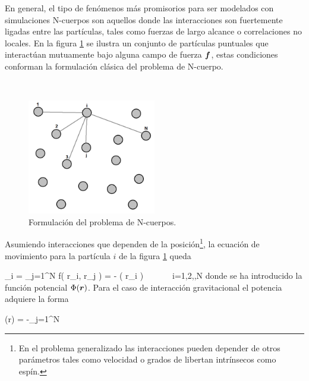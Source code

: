 En general, el tipo de fenómenos más promisorios para ser modelados con 
simulaciones N-cuerpos son aquellos donde las interacciones son 
fuertemente ligadas entre las partículas, tales como fuerzas de largo 
alcance o correlaciones no locales. En la figura \ref{fig:NbodyProblem}
se ilustra un conjunto de partículas puntuales que interactúan mutuamente 
bajo alguna campo de fuerza $\boldsymbol{ f }$, estas condiciones conforman la 
formulación clásica del problema de N-cuerpo.

\
\begin{figure}[htbp]
	\centering
	\includegraphics[width=0.50\textwidth]
	{./figures/3_nbody_simulations/Nbody_Problem.png}

	\caption{\small{Formulación del problema de N-cuerpos.}}
	
	\label{fig:NbodyProblem}
\end{figure}


Asumiendo interacciones que dependen de la posición\footnote{En el 
problema generalizado las interacciones pueden depender de otros 
parámetros tales como velocidad o grados de libertan intrínsecos como 
espín.}, la ecuación de movimiento para la partícula $i$ de la figura
\ref{fig:NbodyProblem} queda \cite{binney2008}


{ _i = \sum_{j=1}^N \bds f( \bds r_i, \bds r_j ) = -\nabla 
\phi( \bds r_i )\ \ \ \ \ \ \ i=1,2,\cdots,N }
donde se ha introducido la función potencial $\Phi(\boldsymbol{ r })$. Para el caso 
de interacción gravitacional el potencia adquiere la forma


{ \phi(\bds r) = -\sum_{j=1}^N   }



